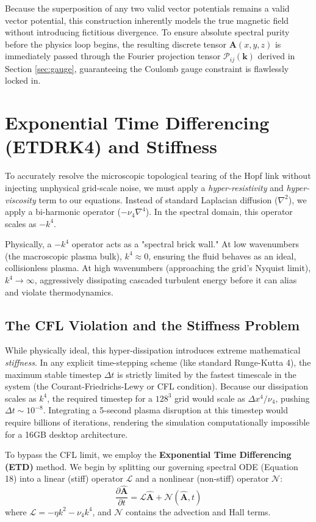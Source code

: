 \documentclass[11pt, a4paper]{article}
\begin{document}
Because the superposition of any two valid vector potentials remains a valid vector potential, this construction inherently models the true magnetic field without introducing fictitious divergence. To ensure absolute spectral purity before the physics loop begins, the resulting discrete tensor $\mathbf{A}(x,y,z)$ is immediately passed through the Fourier projection tensor $\mathcal{P}_{ij}(\mathbf{k})$ derived in Section \ref{sec:gauge}, guaranteeing the Coulomb gauge constraint is flawlessly locked in.

\section{Exponential Time Differencing (ETDRK4) and Stiffness}
\label{sec:etdrk4}

To accurately resolve the microscopic topological tearing of the Hopf link without injecting unphysical grid-scale noise, we must apply a \textit{hyper-resistivity} and \textit{hyper-viscosity} term to our equations. Instead of standard Laplacian diffusion ($\nabla^2$), we apply a bi-harmonic operator ($-\nu_4 \nabla^4$). In the spectral domain, this operator scales as $-k^4$. 

Physically, a $-k^4$ operator acts as a "spectral brick wall." At low wavenumbers (the macroscopic plasma bulk), $k^4 \approx 0$, ensuring the fluid behaves as an ideal, collisionless plasma. At high wavenumbers (approaching the grid's Nyquist limit), $k^4 \to \infty$, aggressively dissipating cascaded turbulent energy before it can alias and violate thermodynamics.

\subsection{The CFL Violation and the Stiffness Problem}
While physically ideal, this hyper-dissipation introduces extreme mathematical \textit{stiffness}. In any explicit time-stepping scheme (like standard Runge-Kutta 4), the maximum stable timestep $\Delta t$ is strictly limited by the fastest timescale in the system (the Courant-Friedrichs-Lewy or CFL condition). Because our dissipation scales as $k^4$, the required timestep for a $128^3$ grid would scale as $\Delta x^4 / \nu_4$, pushing $\Delta t \sim 10^{-8}$. Integrating a 5-second plasma disruption at this timestep would require billions of iterations, rendering the simulation computationally impossible for a 16GB desktop architecture.

To bypass the CFL limit, we employ the \textbf{Exponential Time Differencing (ETD)} method. We begin by splitting our governing spectral ODE (Equation 18) into a linear (stiff) operator $\mathcal{L}$ and a nonlinear (non-stiff) operator $\mathcal{N}$:
\begin{equation}
    \frac{\partial \hat{\mathbf{A}}}{\partial t} = \mathcal{L}\hat{\mathbf{A}} + \mathcal{N}(\hat{\mathbf{A}}, t)
\end{equation}
where $\mathcal{L} = -\eta k^2 - \nu_4 k^4$, and $\mathcal{N}$ contains the advection and Hall terms. 
\end{document}
